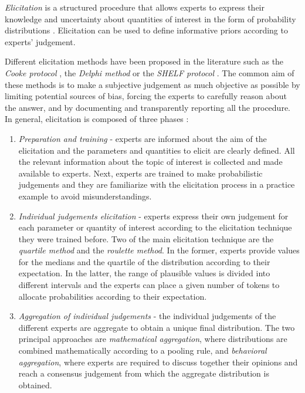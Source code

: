 \documentclass[graybox]{svmult}
\begin{document}
\emph{Elicitation} is a structured procedure that allows experts to express their knowledge and uncertainty about quantities of interest in the form of probability distributions \cite{ohaganExpertKnowledgeElicitation2019}. Elicitation can be used to define informative priors according to  experts' judgement.

Different elicitation methods have been proposed in the literature such as the \emph{Cooke protocol} \cite{cookeExpertsUncertaintyOpinion1991}, the \emph{Delphi method} \cite{roweDelphiTechniqueForecasting1999} or the \emph{SHELF protocol} \cite{oakleySHELFSheffieldElicitation2016}. The common aim of these methods is to make a subjective judgement as much objective as possible by limiting potential sources of bias, forcing the experts to carefully reason about the answer, and by documenting and transparently reporting all the procedure. In general, elicitation is composed of three phases \cite{ohaganUncertainJudgementsEliciting2006}:

\begin{enumerate}
	\item{\emph{Preparation and training} - experts are informed about  the aim of the elicitation and the parameters and quantities to elicit are clearly defined. All the relevant information about the topic of interest is collected and made available to experts. Next, experts are trained to make probabilistic judgements and they are familiarize with the elicitation process in a practice example to avoid misunderstandings. }
	\item{\emph{Individual judgements elicitation} - experts express their own judgement for each parameter or quantity of interest according to the elicitation technique they were trained before. Two of the main elicitation technique are the \emph{quartile method} and the \emph{roulette method}. In the former, experts provide values for the medians  and the quartile of the distribution according to their expectation. In the latter, the range of plausible values is divided into different intervals and the experts can place a given number of tokens to allocate probabilities according to  their expectation.}
	\item{\emph{Aggregation of individual judgements} - the individual judgements of the different experts are aggregate to obtain a unique final distribution. The two principal approaches are \emph{mathematical  aggregation}, where distributions are combined mathematically according to a pooling rule, and \emph{behavioral aggregation}, where experts are required to discuss together their opinions and reach a consensus judgement from which the aggregate distribution is obtained.}
\end{enumerate}
\end{document}
